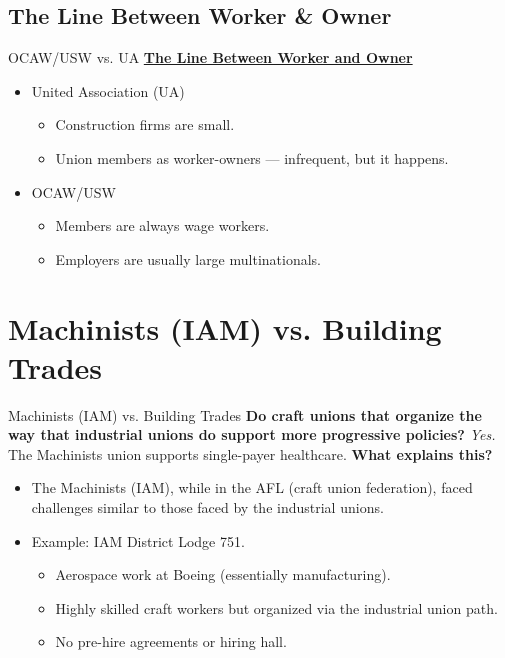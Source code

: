 \documentclass{beamer}
\begin{document}
\subsection*{The Line Between Worker \& Owner}
\begin{frame}{OCAW/USW vs. UA}
\underline{\textbf{The Line Between Worker and Owner}}
	\begin{itemize}
		\item United Association (UA)
		\begin{itemize}
			\item Construction firms are small.
			\item Union members as worker-owners — infrequent, but it happens.
		\end{itemize}
		\item OCAW/USW
			\begin{itemize}
				\item Members are always wage workers.
				\item Employers are usually large multinationals.
			\end{itemize}
	\end{itemize}
\end{frame}


\section{Machinists (IAM) vs. Building Trades}
\begin{frame}{Machinists (IAM) vs. Building Trades}
\textbf{Do craft unions that organize the way that industrial unions do support more progressive policies?}\newline\newline
\emph{Yes.} The Machinists union supports single-payer healthcare.\newline\newline
\textbf{What explains this?}
	\begin{itemize}
		\item The Machinists (IAM), while in the AFL (craft union federation), faced challenges similar to those faced by the industrial unions.
		\item Example: IAM District Lodge 751.
		\begin{itemize}
			\item Aerospace work at Boeing (essentially manufacturing).
			\item Highly skilled craft workers but organized via the industrial union path.
			\item No pre-hire agreements or hiring hall.
		\end{itemize}
	\end{itemize}
\end{frame}
\end{document}
